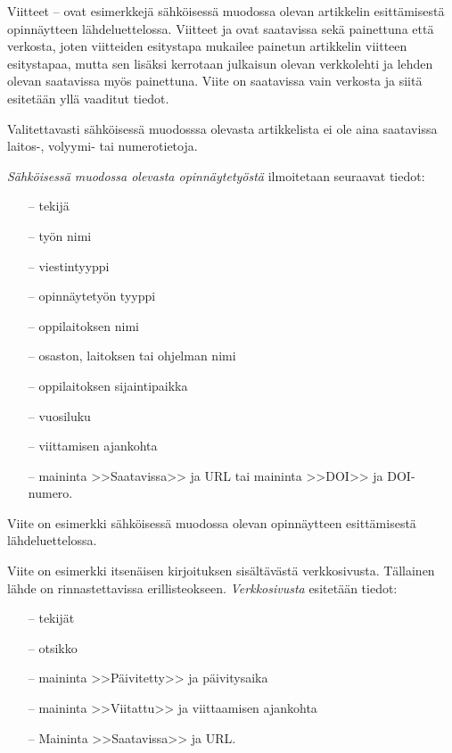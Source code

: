 \documentclass[english,12pt,a4paper,pdftex,elec,utf8]{aaltothesis}
\begin{document}
Viitteet \cite{Ribeiro}--\cite{kone} ovat esimerkkej\"a s\"ahk\"oisess\"a
muodossa olevan artikkelin esitt\"amisest\"a opinn\"aytteen
l\"ahdeluettelossa.  Viitteet \cite{Ribeiro} ja \cite{Stieber} ovat
saatavissa sek\"a painettuna ett\"a verkosta, joten viitteiden esitystapa
mukailee painetun artikkelin viitteen esitystapaa, mutta sen lis\"aksi
kerrotaan julkaisun olevan verkkolehti ja lehden olevan saatavissa
my\"os painettuna.  Viite \cite{kone} on saatavissa vain verkosta ja
siit\"a esitet\"a\"an yll\"a vaaditut tiedot.

Valitettavasti s\"ahk\"oisess\"a muodosssa olevasta artikkelista ei ole aina
saatavissa lai\-tos-, volyymi- tai numerotietoja.

\textit{S\"ahk\"oisess\"a muodossa olevasta opinn\"aytety\"ost\"a} ilmoitetaan
seuraavat tiedot:

\begin{itemize}
\item[--]tekij\"a
\item[--]ty\"on nimi
\item[--]viestintyyppi
\item[--]opinn\"aytety\"on tyyppi
\item[--]oppilaitoksen nimi
\item[--]osaston, laitoksen tai ohjelman nimi
\item[--]oppilaitoksen sijaintipaikka
\item[--]vuosiluku
\item[--]viittamisen ajankohta
\item[--]maininta >>Saatavissa>> ja URL tai
        maininta >>DOI>> ja DOI-numero.
\end{itemize}

Viite \cite{Adida} on esimerkki s\"ahk\"oisess\"a muodossa olevan
opinn\"aytteen esitt\"amisest\"a l\"ahdeluettelossa.

Viite \cite{viittaaminen} on esimerkki itsen\"aisen kirjoituksen sis\"alt\"av\"ast\"a
verkkosivusta. T\"allainen l\"ahde on rinnastettavissa erillisteokseen.
\textit{Verkkosivusta} esitet\"a\"an tiedot:

\begin{itemize}
\item[--] tekij\"at
\item[--] otsikko
\item[--] maininta >>P\"aivitetty>> ja p\"aivitysaika
\item[--] maininta >>Viitattu>> ja viittaamisen ajankohta
\item[--] Maininta >>Saatavissa>> ja URL.
\end{itemize}
\end{document}
